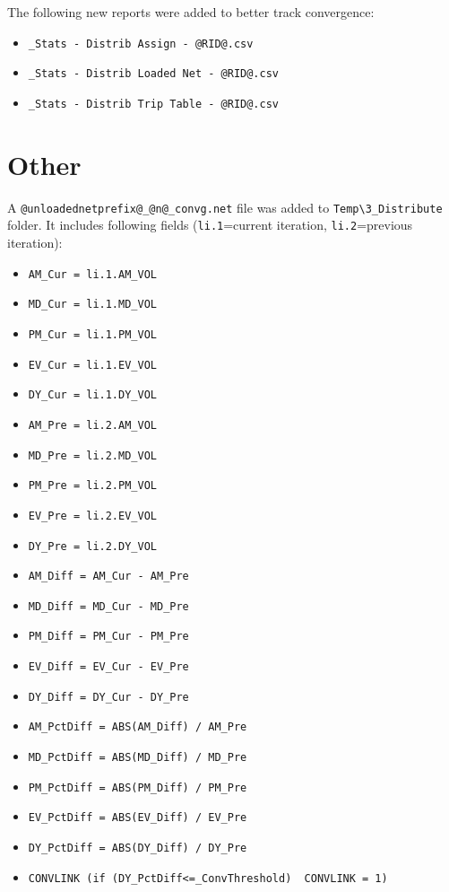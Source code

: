 \documentclass[
  letterpaper,
  DIV=11,
  numbers=noendperiod]{scrreprt}
\providecommand{\tightlist}{%
  \setlength{\itemsep}{0pt}\setlength{\parskip}{0pt}}\usepackage{longtable,booktabs,array}
\begin{document}
The following new reports were added to better track convergence:

\begin{itemize}
\tightlist
\item
  \texttt{\_Stats\ -\ Distrib\ Assign\ -\ @RID@.csv}
\item
  \texttt{\_Stats\ -\ Distrib\ Loaded\ Net\ -\ @RID@.csv}
\item
  \texttt{\_Stats\ -\ Distrib\ Trip\ Table\ -\ @RID@.csv}
\end{itemize}

\hypertarget{other}{%
\section{Other}\label{other}}

A \texttt{@unloadednetprefix@\_@n@\_convg.net} file was added to
\texttt{Temp\textbackslash{}3\_Distribute} folder. It includes following
fields (\texttt{li.1}=current iteration, \texttt{li.2}=previous
iteration):

\begin{itemize}
\tightlist
\item
  \texttt{AM\_Cur\ =\ li.1.AM\_VOL}
\item
  \texttt{MD\_Cur\ =\ li.1.MD\_VOL}
\item
  \texttt{PM\_Cur\ =\ li.1.PM\_VOL}
\item
  \texttt{EV\_Cur\ =\ li.1.EV\_VOL}
\item
  \texttt{DY\_Cur\ =\ li.1.DY\_VOL}
\item
  \texttt{AM\_Pre\ =\ li.2.AM\_VOL}
\item
  \texttt{MD\_Pre\ =\ li.2.MD\_VOL}
\item
  \texttt{PM\_Pre\ =\ li.2.PM\_VOL}
\item
  \texttt{EV\_Pre\ =\ li.2.EV\_VOL}
\item
  \texttt{DY\_Pre\ =\ li.2.DY\_VOL}
\item
  \texttt{AM\_Diff\ =\ AM\_Cur\ -\ AM\_Pre}
\item
  \texttt{MD\_Diff\ =\ MD\_Cur\ -\ MD\_Pre}
\item
  \texttt{PM\_Diff\ =\ PM\_Cur\ -\ PM\_Pre}
\item
  \texttt{EV\_Diff\ =\ EV\_Cur\ -\ EV\_Pre}
\item
  \texttt{DY\_Diff\ =\ DY\_Cur\ -\ DY\_Pre}
\item
  \texttt{AM\_PctDiff\ =\ ABS(AM\_Diff)\ /\ AM\_Pre}
\item
  \texttt{MD\_PctDiff\ =\ ABS(MD\_Diff)\ /\ MD\_Pre}
\item
  \texttt{PM\_PctDiff\ =\ ABS(PM\_Diff)\ /\ PM\_Pre}
\item
  \texttt{EV\_PctDiff\ =\ ABS(EV\_Diff)\ /\ EV\_Pre}
\item
  \texttt{DY\_PctDiff\ =\ ABS(DY\_Diff)\ /\ DY\_Pre}
\item
  \texttt{CONVLINK\ (if\ (DY\_PctDiff\textless{}=\_ConvThreshold)\ \ CONVLINK\ =\ 1)}
\end{itemize}
\end{document}
